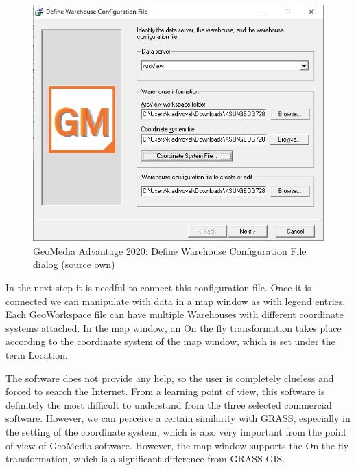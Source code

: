 \documentclass[a4paper,10pt,twoside]{article}
\begin{document}
\vspace{0.3cm}
\begin{figure}[hbt!] 
\begin{center}
\includegraphics[width=12cm]{../pictures/define_config_geomedia.png} 
\caption[GeoMedia Advantage 2020: Define Warehouse Configuration File dialog (source own)]{GeoMedia Advantage 2020: Define Warehouse Configuration File dialog (source own)}
\label{fig:define_config_geomedia}
\end{center}
\end{figure}

\noindent In the next step it is needful to connect this configuration file. Once it is connected we can manipulate with data in a map window as with legend entries. Each GeoWorkspace file can have multiple Warehouses with different coordinate systems attached. In the map window, an On the fly transformation takes place according to the coordinate system of the map window, which is set under the term Location.

The software does not provide any help, so the user is completely clueless and forced to search the Internet. From a learning point of view, this software is definitely the most difficult to understand from the three selected commercial software. However, we can perceive a certain similarity with GRASS, especially in the setting of the coordinate system, which is also very important from the point of view of GeoMedia software. However, the map window supports the On the fly transformation, which is a significant difference from GRASS GIS.

\newpage
\vspace*{-1cm}
\bigskip
\end{document}
